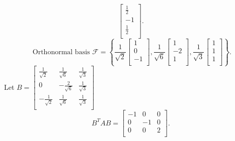 \documentclass{report}
\begin{document}
{\[\begin{bmatrix}
       \frac{1}{2}\\
      -1\\
      \frac{1}{2}\\
      \end{bmatrix}
    .\] 
    \[
    \text{ Orthonormal basis } \mathcal{F} = \left\{ \frac{1}{ \sqrt{2} }  \begin{bmatrix}
    1\\
    0\\
    -1\\
    \end{bmatrix}
     , \frac{1}{ \sqrt{6} } \begin{bmatrix}
     1\\
     -2\\
     1\\
     \end{bmatrix}
      , \frac{1}{ \sqrt{3} } \begin{bmatrix}
      1\\
      1\\
      1\\
      \end{bmatrix}
    \right\}
    .\] 
    Let $ B = \begin{bmatrix}
    \frac{1}{ \sqrt{2} } & \frac{1}{ \sqrt{6} } & \frac{1}{ \sqrt{3} }\\
     0 & - \frac{ 2  }{  \sqrt{6}  } & \frac{1}{ \sqrt{3} } \\
     - \frac{1}{ \sqrt{2} }& \frac{1}{ \sqrt{6} }  & \frac{1}{ \sqrt{3} } \\
    \end{bmatrix}$
    \[
    B ^{T}A B = \begin{bmatrix}
    -1 & 0 & 0\\
    0 & -1 & 0\\
    0 & 0 & 2\\
    \end{bmatrix}
    .\] 
   }
\end{document}
